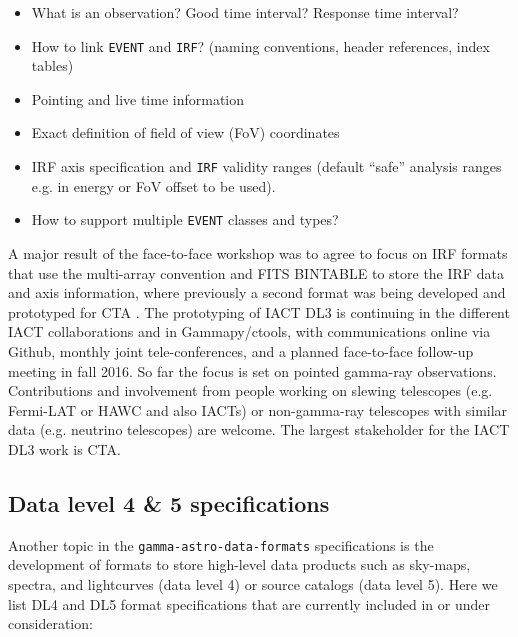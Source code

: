 \begin{itemize}
\item{}What is an observation? Good time interval? Response time interval?
\item{}How to link \texttt{EVENT} and \texttt{IRF}? (naming conventions, header references, index tables)
\item{}Pointing and live time information
\item{}Exact definition of field of view (FoV) coordinates
\item{}IRF axis specification and \texttt{IRF} validity ranges (default ``safe'' analysis ranges e.g. in energy or FoV offset to be used).
\item{}How to support multiple \texttt{EVENT} classes and types?
\end{itemize}



A major result of the face-to-face workshop was to agree to focus on IRF formats that use the multi-array convention and FITS BINTABLE to store the IRF data and axis information, where previously a second format was being developed and prototyped for CTA \citep{2015arXiv150807437W}. The prototyping of IACT DL3 is continuing in the different IACT collaborations and in Gammapy/ctools, with communications online via Github, monthly joint tele-conferences, and a planned face-to-face follow-up meeting in fall 2016. So far the focus is set on pointed gamma-ray observations. Contributions and involvement from people working on slewing telescopes (e.g. Fermi-LAT or HAWC and also IACTs) or non-gamma-ray telescopes with similar data (e.g. neutrino telescopes) are welcome. The largest stakeholder for the IACT DL3 work is CTA.


\subsection{Data level 4 \& 5 specifications}

Another topic in the \texttt{gamma-astro-data-formats} specifications is the development of formats to store high-level data products such as sky-maps, spectra, and lightcurves (data level 4) or source catalogs (data level 5).  Here we list DL4 and DL5 format specifications that are currently included in \gadf or under consideration:

